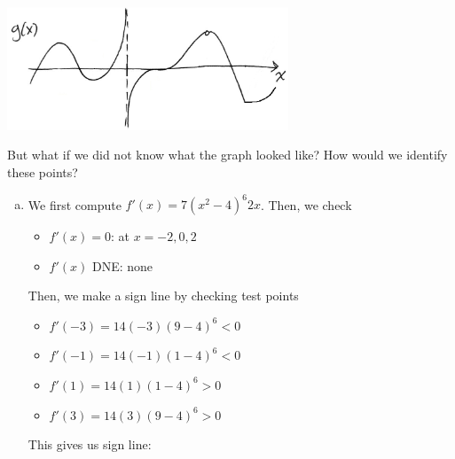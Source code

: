 \documentclass[11pt]{exam}
\begin{document}
\begin{center}
	\includegraphics[width=3.3in]{biggraph2.jpg}
\end{center}
But what if we did not know what the graph looked like? How would we identify these points?  
\vspace{0.2in}
\begin{questions}
  \question
    \begin{solution}
      \begin{enumerate}[(a)]
      \item We first compute \(f'(x) = 7(x^2-4)^6 2x\). Then, we check
        \begin{itemize}
        \item \(f'(x) = 0\): at \(x=-2, 0, 2\)
        \item \(f'(x)\) DNE: none
        \end{itemize}
        Then, we make a sign line by checking test points
        \begin{itemize}
        \item \(f'(-3) = 14(-3)(9-4)^6 < 0\)
        \item \(f'(-1) = 14(-1)(1-4)^6 < 0\)
        \item \(f'(1) = 14(1)(1-4)^6 > 0\)
        \item \(f'(3) = 14(3)(9-4)^6 > 0\)
        \end{itemize}
        This gives us sign line:


\end{enumerate}
\end{solution}
\end{questions}
\end{document}
